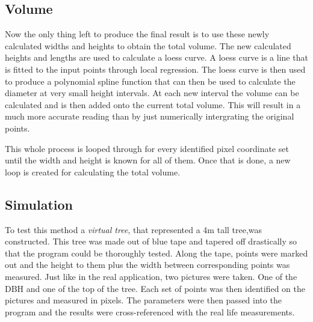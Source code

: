 \subsection{Volume}
Now the only thing left to produce the final result is to use these newly calculated widths and heights to obtain the total volume. The new calculated heights and lengths are used to calculate a loess curve. A loess curve is a line that is fitted to the input points through local regression. The loess curve is then used to produce a polynomial spline function that can then be used to calculate the diameter at very small height intervals. At each new interval the volume can be calculated and is then added onto the current total volume. This will result in a much more accurate reading than by just numerically intergrating the original points.

This whole process is looped through for every identified pixel coordinate set until the width and height is known for all of them. Once that is done, a new loop is created for calculating the total volume.

\subsection{Simulation}
To test this method a \emph{virtual tree}, that represented a 4m tall tree,was constructed. This tree was made out of blue tape and tapered off drastically so that the program could be thoroughly tested. Along the tape, points were marked out and the height to them plus the width between corresponding points was measured. Just like in the real application, two pictures were taken. One of the DBH and one of the top of the tree. Each set of points was then identified on the pictures and measured in pixels. The parameters were then passed into the program and the results were cross-referenced with the real life measurements.

\newpage

